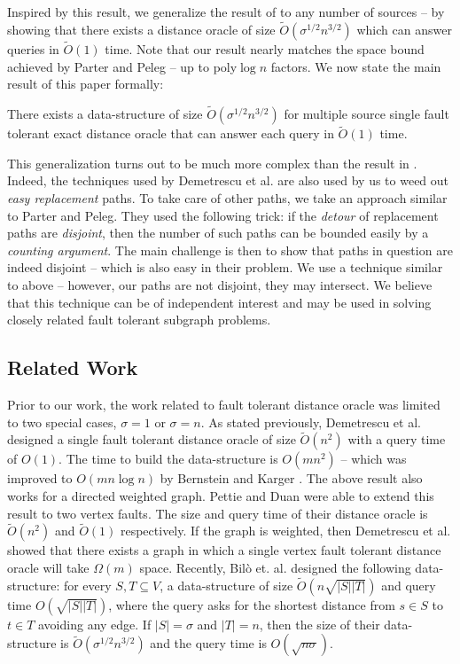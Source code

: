 Inspired by this result,
we generalize the result of \cite{DemetrescuTCR08} to any
number of sources --
by showing that there exists a distance oracle of size $\tilde
O(\sigma^{1/2} n^{3/2})$
which can answer queries in $\tilde O(1)$ time. Note that
our result nearly matches
the space bound achieved by Parter and Peleg\cite{ParterP13}
-- up to poly$\log n$ factors.
We now state the main result of this paper formally:
\begin{theorem}
\label{thm:maintheorem}
  There exists a data-structure of size $\tilde O(\sigma^{1/2}n^{3/2})$
  for multiple source single fault tolerant exact distance
oracle
  that can answer each query in $\tilde O(1)$ time.
\end{theorem}

This generalization turns out to be much more complex than
the result in \cite{DemetrescuTCR08}.
Indeed, the techniques used by Demetrescu et al. \cite{DemetrescuTCR08}
are also used
by us to weed out {\em easy replacement} paths. To take
care of other paths,
we take an approach similar to Parter and Peleg\cite{ParterP13}.
They used the following trick:
if the {\em detour} of replacement paths are {\em disjoint},
then the number of such
paths can be bounded easily by a {\em counting argument}.
The main challenge is
then to show that paths in question are indeed disjoint
-- which is also easy
in their problem. We use a technique similar to above --
however, our paths are not disjoint,
they {may intersect}.  We believe that this technique can
be of independent interest and may be used in solving
closely related fault tolerant subgraph problems.

\iflong
\else
\vspace{-2mm}
\fi
\subsection{Related Work}
Prior to our work, the work related to fault tolerant
distance oracle was limited to two special cases, $\sigma
=1$ or $\sigma = n$.
As stated previously, Demetrescu et al. \cite{DemetrescuTCR08}
designed a single fault
tolerant distance oracle of size $\tilde O(n^2)$ with a
query time of $O(1)$.
The time to build the data-structure is $O(mn^2)$ --  which
was improved to
$O(m n \log n)$ by Bernstein and Karger \cite{BernsteinK09}.
The above result also works for a directed weighted graph.
Pettie and Duan \cite{DuanP09} were able to extend this
result to two vertex faults.
The size and query time of their distance oracle is $\tilde
O(n^2)$ and $\tilde O(1)$
respectively.
If the graph is weighted, then Demetrescu et al. \cite{DemetrescuTCR08}
showed that
there exists a graph in which a single vertex fault tolerant
distance oracle will
take $\Omega(m)$ space.
Recently, Bil{\`o} et. al. \cite{BiloCGLP17} designed the
following data-structure:  for every $S,T \subseteq V$,
a data-structure of size $\tilde O(n \sqrt{|S||T|})$ and
query time $O(\sqrt{|S||T|})$, where the query asks for
the shortest distance from $s \in S$ to $t \in T$ avoiding
any edge. If $|S| = \sigma$ and $|T| = n$, then the size
of their data-structure is $\tilde O(\sigma^{1/2}n^{3/2})$
and the query time is $O(\sqrt{n\sigma})$.%

